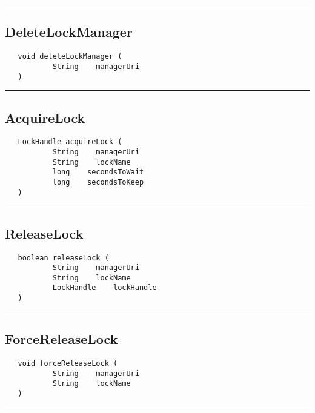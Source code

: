 \rule{15cm}{2pt}
\subsection{DeleteLockManager}
\label{Api:DeleteLockManager}
\begin{verbatim}
   void deleteLockManager (
           String    managerUri
   )
\end{verbatim}



\rule{15cm}{2pt}
\subsection{AcquireLock}
\label{Api:AcquireLock}
\begin{verbatim}
   LockHandle acquireLock (
           String    managerUri
           String    lockName
           long    secondsToWait
           long    secondsToKeep
   )
\end{verbatim}



\rule{15cm}{2pt}
\subsection{ReleaseLock}
\label{Api:ReleaseLock}
\begin{verbatim}
   boolean releaseLock (
           String    managerUri
           String    lockName
           LockHandle    lockHandle
   )
\end{verbatim}



\rule{15cm}{2pt}
\subsection{ForceReleaseLock}
\label{Api:ForceReleaseLock}
\begin{verbatim}
   void forceReleaseLock (
           String    managerUri
           String    lockName
   )
\end{verbatim}



\rule{15cm}{2pt}
